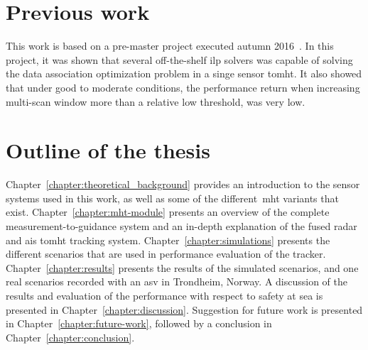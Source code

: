 \section{Previous work}\label{sec:previous_work}
This work is based on a pre-master project executed autumn 2016~\cite[url=true]{Liland_2017}. In this project, it was shown that several off-the-shelf \gls{ilp} \glspl{solver} was capable of solving the data association optimization problem in a singe sensor \gls{tomht}. It also showed that under good to moderate conditions, the performance return when increasing multi-scan window more than a relative low threshold, was very low.

\section{Outline of the thesis}\label{sec:outline_thesis}
Chapter~\ref{chapter:theoretical_background} provides an introduction to the sensor systems used in this work, as well as some of the different~\gls{mht} variants that exist. Chapter~\ref{chapter:mht-module} presents an overview of the complete measurement-to-guidance system and an in-depth explanation of the fused \gls{radar} and \gls{ais} \gls{tomht} tracking system. Chapter~\ref{chapter:simulations} presents the different scenarios that are used in performance evaluation of the tracker. Chapter~\ref{chapter:results} presents the results of the simulated scenarios, and one real scenarios recorded with an \gls{asv} in Trondheim, Norway. A discussion of the results and evaluation of the performance with respect to safety at sea is presented in Chapter~\ref{chapter:discussion}. Suggestion for future work is presented in Chapter~\ref{chapter:future-work}, followed by a conclusion in Chapter~\ref{chapter:conclusion}.